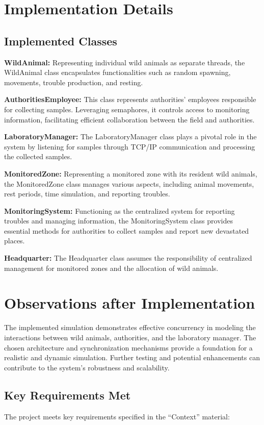 \documentclass{article}
\begin{document}
\section{Implementation Details}
\subsection{Implemented Classes}
\textbf{WildAnimal:}
Representing individual wild animals as separate threads, the WildAnimal class encapsulates functionalities such as random spawning, movements, trouble production, and resting.

\textbf{AuthoritiesEmployee:}
This class represents authorities' employees responsible for collecting samples. Leveraging semaphores, it controls access to monitoring information, facilitating efficient collaboration between the field and authorities.

\textbf{LaboratoryManager:}
The LaboratoryManager class plays a pivotal role in the system by listening for samples through TCP/IP communication and processing the collected samples.

\textbf{MonitoredZone:}
Representing a monitored zone with its resident wild animals, the MonitoredZone class manages various aspects, including animal movements, rest periods, time simulation, and reporting troubles.

\textbf{MonitoringSystem:}
Functioning as the centralized system for reporting troubles and managing information, the MonitoringSystem class provides essential methods for authorities to collect samples and report new devastated places.

\textbf{Headquarter:}
The Headquarter class assumes the responsibility of centralized management for monitored zones and the allocation of wild animals.

\section{Observations after Implementation}
The implemented simulation demonstrates effective concurrency in modeling the interactions between wild animals, authorities, and the laboratory manager. The chosen architecture and synchronization mechanisms provide a foundation for a realistic and dynamic simulation. Further testing and potential enhancements can contribute to the system's robustness and scalability.

\subsection{Key Requirements Met}
The project meets key requirements specified in the ``Context'' material:
\end{document}
